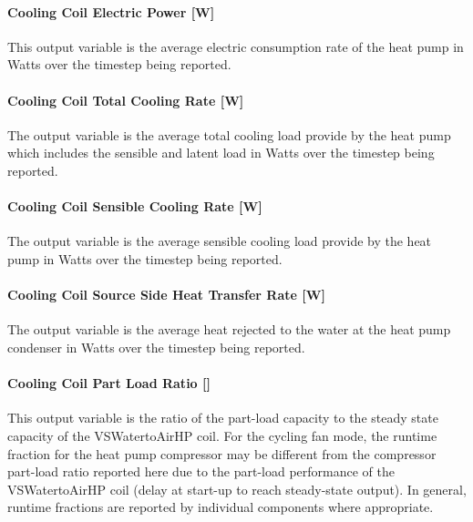 \paragraph{Cooling Coil Electric Power {[}W{]}}\label{cooling-coil-electric-power-w-3}

This output variable is the average electric consumption rate of the heat pump in Watts over the timestep being reported.

\paragraph{Cooling Coil Total Cooling Rate {[}W{]}}\label{cooling-coil-total-cooling-rate-w-9}

The output variable is the average total cooling load provide by the heat pump which includes the sensible and latent load in Watts over the timestep being reported.

\paragraph{Cooling Coil Sensible Cooling Rate {[}W{]}}\label{cooling-coil-sensible-cooling-rate-w-9}

The output variable is the average sensible cooling load provide by the heat pump in Watts over the timestep being reported.

\paragraph{Cooling Coil Source Side Heat Transfer Rate {[}W{]}}\label{cooling-coil-source-side-heat-transfer-rate-w-2}

The output variable is the average heat rejected to the water at the heat pump condenser in Watts over the timestep being reported.

\paragraph{Cooling Coil Part Load Ratio {[]}}\label{cooling-coil-part-load-ratio-2}

This output variable is the ratio of the part-load capacity to the steady state capacity of the VSWatertoAirHP coil. For the cycling fan mode, the runtime fraction for the heat pump compressor may be different from the compressor part-load ratio reported here due to the part-load performance of the VSWatertoAirHP coil (delay at start-up to reach steady-state output). In general, runtime fractions are reported by individual components where appropriate.

